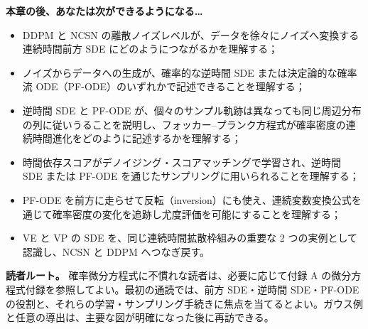 \textbf{本章の後、あなたは次ができるようになる…}

\begin{itemize}
\item DDPM と NCSN の離散ノイズレベルが、データを徐々にノイズへ変換する連続時間前方 SDE にどのようにつながるかを理解する；
\item ノイズからデータへの生成が、確率的な逆時間 SDE または決定論的な確率流 ODE（PF-ODE）のいずれかで記述できることを理解する；
\item 逆時間 SDE と PF-ODE が、個々のサンプル軌跡は異なっても同じ周辺分布の列に従いうることを説明し、フォッカー–プランク方程式が確率密度の連続時間進化をどのように記述するかを理解する；
\item 時間依存スコアがデノイジング・スコアマッチングで学習され、逆時間 SDE または PF-ODE を通じたサンプリングに用いられることを理解する；
\item PF-ODE を前方に走らせて反転（inversion）にも使え、連続変数変換公式を通じて確率密度の変化を追跡し尤度評価を可能にすることを理解する；
\item VE と VP の SDE を、同じ連続時間拡散枠組みの重要な 2 つの実例として認識し、NCSN と DDPM へつなぎ戻す。
\end{itemize}


\textbf{読者ルート。} 確率微分方程式に不慣れな読者は、必要に応じて付録 A の微分方程式付録を参照してよい。最初の通読では、前方 SDE・逆時間 SDE・PF-ODE の役割と、それらの学習・サンプリング手続きに焦点を当てるとよい。ガウス例と任意の導出は、主要な図が明確になった後に再訪できる。

